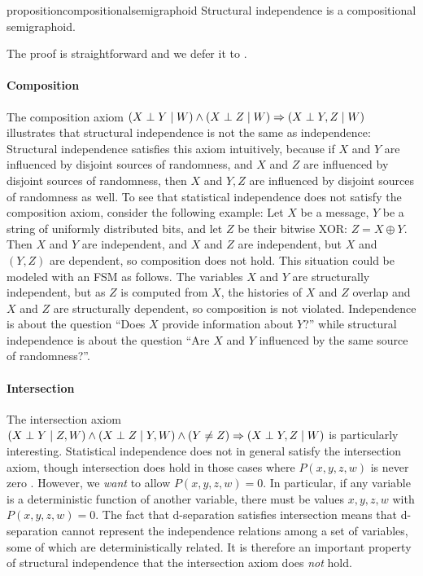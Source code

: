 \documentclass[USenglish,onecolumn]{article}
\begin{document}
\begin{restatable}{proposition}{compositionalsemigraphoid}
\label{prop:compositionalsemigraphoid}
Structural independence is a compositional semigraphoid.
\end{restatable}
The proof is straightforward and we defer it to .

\paragraph*{Composition} The composition axiom $(X\mathrel{\perp} Y\mid W)\land(  X\mathrel{\perp} Z\mid W)\Rightarrow (X\mathrel{\perp} Y,Z\mid W)$ illustrates that structural independence is not the same as independence: Structural independence satisfies this axiom intuitively, because if $X$ and $Y$ are influenced by disjoint sources of randomness, and $X$ and $Z$ are influenced by disjoint sources of randomness, then $X$ and $Y,Z$ are influenced by disjoint sources of randomness as well. To see that statistical independence does not satisfy the composition axiom, consider the following example:
Let $X$ be a message, $Y$ be a string of uniformly distributed bits, and let $Z$ be their bitwise XOR: $Z=X\oplus Y$. Then $X$ and $Y$ are independent, and $X$ and $Z$ are independent, but $X$ and $(Y,Z)$ are dependent, so composition does not hold. This situation could be modeled with an FSM as follows. The variables $X$ and $Y$ are structurally independent, but as $Z$ is computed from $X$, the histories of $X$ and $Z$ overlap and $X$ and $Z$ are structurally dependent, so composition is not violated. Independence is about the question ``Does $X$ provide information about $Y$?'' while structural independence is about the question ``Are $X$ and $Y$ influenced by the same source of randomness?''.


\paragraph*{Intersection} The intersection axiom $(X\perp Y\mid  Z,W)\land (X\perp Z\mid Y,W)\land (Y\ne Z)\Rightarrow (X\perp Y,Z\mid W)$ is particularly interesting. Statistical independence does not in general satisfy the intersection axiom, though intersection does hold in those cases where $P(x,y,z,w)$ is never zero \cite{pearl1988probabilistic}. However, we \textit{want} to allow $P(x,y,z,w)=0$. In particular, if any variable is a deterministic function of another variable, there must be values $x,y,z,w$ with $P(x,y,z,w)=0$. The fact that d-separation satisfies intersection means that d-separation cannot represent the independence relations among a set of variables, some of which are deterministically related. It is therefore an important property of structural independence that the intersection axiom does \textit{not} hold.
\end{document}
